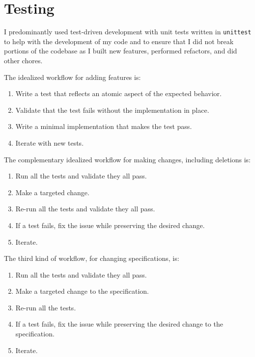 \documentclass[10pt,letterpaper,final]{report}
\begin{document}
\pagebreak

\section{Testing}\label{sec:testing}

I predominantly used test-driven development with unit tests written in \texttt{unittest} to help with the development of my code and to ensure that I did not break portions of the codebase as I built new features, performed refactors, and did other chores.

\noindent The idealized workflow for adding features is:

\begin{enumerate}
  \item Write a test that reflects an atomic aspect of the expected behavior.
  \item Validate that the test fails without the implementation in place.
  \item Write a minimal implementation that makes the test pass.
  \item Iterate with new tests.
\end{enumerate}

\noindent The complementary idealized workflow for making changes, including deletions is:

\begin{enumerate}
  \item Run all the tests and validate they all pass.
  \item Make a targeted change.
  \item Re-run all the tests and validate they all pass.
  \item If a test fails, fix the issue while preserving the desired change.
  \item Iterate.
\end{enumerate}

\noindent The third kind of workflow, for changing specifications, is:

\begin{enumerate}
  \item Run all the tests and validate they all pass.
  \item Make a targeted change to the specification.
  \item Re-run all the tests.
  \item If a test fails, fix the issue while preserving the desired change to the specification.
  \item Iterate.
\end{enumerate}
\end{document}
